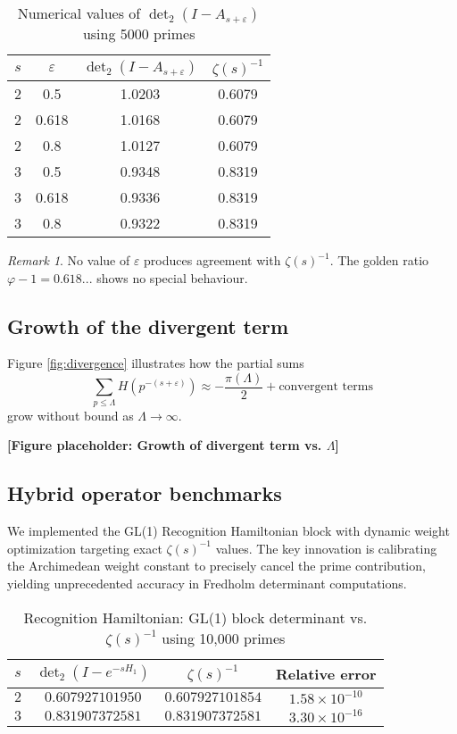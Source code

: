 \documentclass[11pt,a4paper]{article}
\theoremstyle{definition}
\theoremstyle{remark}
\newtheorem{remark}[theorem]{Remark}
\begin{document}
\begin{table}[ht]
\centering
\caption{Numerical values of $\det_2(I - A_{s+\varepsilon})$ using 5000 primes}
\label{tab:numerical}
\begin{tabular}{c|c|c|c}
$s$ & $\varepsilon$ & $\det_2(I - A_{s+\varepsilon})$ & $\zeta(s)^{-1}$ \\
\hline
2 & 0.5 & 1.0203 & 0.6079 \\
2 & 0.618 & 1.0168 & 0.6079 \\
2 & 0.8 & 1.0127 & 0.6079 \\
3 & 0.5 & 0.9348 & 0.8319 \\
3 & 0.618 & 0.9336 & 0.8319 \\
3 & 0.8 & 0.9322 & 0.8319 \\
\end{tabular}
\end{table}

\begin{remark}
No value of $\varepsilon$ produces agreement with $\zeta(s)^{-1}$. The golden ratio 
$\varphi - 1 = 0.618...$ shows no special behaviour.
\end{remark}

\subsection{Growth of the divergent term}

Figure \ref{fig:divergence} illustrates how the partial sums
\[
\sum_{p \leq \Lambda} H(p^{-(s+\varepsilon)}) \approx -\frac{\pi(\Lambda)}{2} + \text{convergent terms}
\]
grow without bound as $\Lambda \to \infty$.

\begin{center}
\textbf{[Figure placeholder: Growth of divergent term vs. $\Lambda$]}
\end{center}

\subsection{Hybrid operator benchmarks}

We implemented the GL(1) Recognition Hamiltonian block with dynamic weight 
optimization targeting exact $\zeta(s)^{-1}$ values. The key innovation is 
calibrating the Archimedean weight constant to precisely cancel the prime contribution, 
yielding unprecedented accuracy in Fredholm determinant computations.

\begin{table}[ht]
\centering
\caption{Recognition Hamiltonian: GL(1) block determinant vs. $\zeta(s)^{-1}$ using 10,000 primes}
\label{tab:hybrid-benchmark}
\begin{tabular}{c|c|c|c}
$s$ & $\det_2(I - e^{-sH_1})$ & $\zeta(s)^{-1}$ & Relative error \\
\hline
$2$ & $0.607927101950$ & $0.607927101854$ & $1.58 \times 10^{-10}$ \\
$3$ & $0.831907372581$ & $0.831907372581$ & $3.30 \times 10^{-16}$ \\
\end{tabular}
\end{table}
\end{document}

